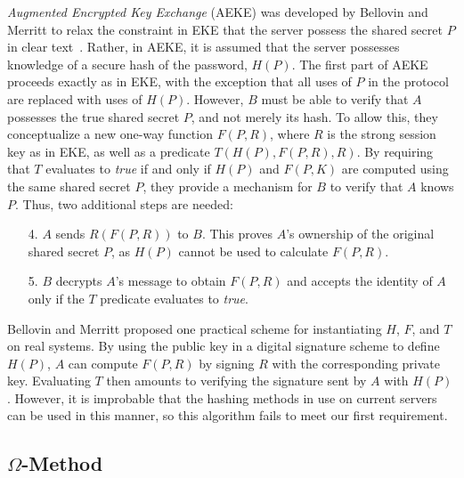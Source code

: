 \emph{Augmented Encrypted Key Exchange} (AEKE) was developed by
Bellovin and Merritt to relax the constraint in EKE that the server
possess the shared secret $P$ in clear text~\cite{bellovin93}. Rather,
in AEKE, it is assumed that the server possesses knowledge of a secure
hash of the password, $H(P)$. The first part of AEKE proceeds exactly
as in EKE, with the exception that all uses of $P$ in the protocol are
replaced with uses of $H(P)$. However, $B$ must be able to verify that
$A$ possesses the true shared secret $P$, and not merely its hash. To
allow this, they conceptualize a new one-way function $F(P,R)$, where
$R$ is the strong session key as in EKE, as well as a predicate
$T(H(P),F(P,R),R)$. By requiring that $T$ evaluates to \emph{true} if
and only if $H(P)$ and $F(P,K)$ are computed using the same shared
secret $P$, they provide a mechanism for $B$ to verify that $A$ knows
$P$. Thus, two additional steps are needed:
\begin{enumerate}
  \item[4.] $A$ sends $R(F(P,R))$ to $B$. This proves $A$'s ownership
  of the original shared secret $P$, as $H(P)$ cannot be used to
  calculate $F(P,R)$.
  \item[5.] $B$ decrypts $A$'s message to obtain $F(P,R)$ and accepts
  the identity of $A$ only if the $T$ predicate evaluates to
  \emph{true}.
\end{enumerate}
Bellovin and Merritt proposed one practical scheme for instantiating
$H$, $F$, and $T$ on real systems. By using the public key in a
digital signature scheme to define $H(P)$, $A$ can compute $F(P,R)$ by
signing $R$ with the corresponding private key. Evaluating $T$ then
amounts to verifying the signature sent by $A$ with $H(P)$. However,
it is improbable that the hashing methods in use on current servers
can be used in this manner, so this algorithm fails to meet our first
requirement.

\subsection*{$\Omega$-Method}

